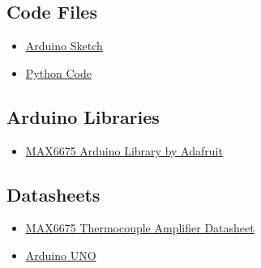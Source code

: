 \documentclass[12pt]{article}
\begin{document}
\subsection*{Code Files}
\begin{itemize}
  \item \href{https://drive.google.com/drive/folders/1wMh31OFrIGAUljoBokALCiHEpB-sdrlg?usp=drive_link}{Arduino Sketch}
\end{itemize}
\vspace{-2mm}
\begin{itemize}
  \item \href{https://drive.google.com/drive/folders/1SQ3UnZ2PInPbBjg0NKGbhzvTFUVvuViB?usp=sharing}{Python Code}
\end{itemize}
\subsection*{Arduino Libraries}
\begin{itemize}
  \item \href{https://github.com/adafruit/MAX6675-library}{MAX6675 Arduino Library by Adafruit}
\end{itemize}

\subsection*{Datasheets}
\begin{itemize}
  \item \href{https://datasheets.maximintegrated.com/en/ds/MAX6675.pdf}{MAX6675 Thermocouple Amplifier Datasheet}
   \item \href{https://docs.arduino.cc/hardware/uno-rev3/}{Arduino UNO}
  \end{itemize}
\end{document}
